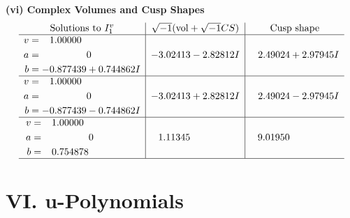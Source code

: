 \documentclass[1p]{elsarticle_modified}
\theoremstyle{definition}
\newcommand{\I}{\sqrt{-1}}
\begin{document}
\newpage\flushleft \textbf{(vi) Complex Volumes and Cusp Shapes}
$$\begin{array}{c|c|c}  
\text{Solutions to }I^v_{1}& \I (\text{vol} + \sqrt{-1}CS) & \text{Cusp shape}\\
 \hline 
\begin{aligned}
v &= \phantom{-}1.00000\phantom{ +0.000000I} \\
a &= \phantom{-0.000000 } 0 \\
b &= -0.877439 + 0.744862 I\end{aligned}
 & -3.02413 - 2.82812 I & \phantom{-}2.49024 + 2.97945 I \\ \hline\begin{aligned}
v &= \phantom{-}1.00000\phantom{ +0.000000I} \\
a &= \phantom{-0.000000 } 0 \\
b &= -0.877439 - 0.744862 I\end{aligned}
 & -3.02413 + 2.82812 I & \phantom{-}2.49024 - 2.97945 I \\ \hline\begin{aligned}
v &= \phantom{-}1.00000\phantom{ +0.000000I} \\
a &= \phantom{-0.000000 } 0 \\
b &= \phantom{-}0.754878\phantom{ +0.000000I}\end{aligned}
 & \phantom{-}1.11345\phantom{ +0.000000I} & \phantom{-}9.01950\phantom{ +0.000000I}\\
 \hline 
 \end{array}$$\newpage
\newpage\renewcommand{\arraystretch}{1}
\centering \section*{ VI. u-Polynomials}
\end{document}
